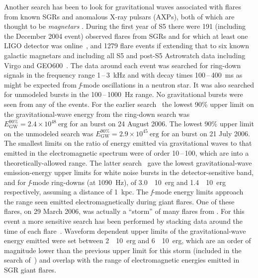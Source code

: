 Another search has been to look for gravitational waves associated with flares from known SGRs and anomalous 
X-ray pulsars (AXPs), both of which are thought to be \textit{magnetars} \cite{Mereghetti2008}. During the 
first year of S5 there were 191 (including the December 2004  event) observed 
flares from SGRs  and
 for which at least one LIGO detector was online~\cite{Abbott:2008h}, and
1279 flare events if extending that to six known galactic magnetars and including all S5 and post-S5 
Astrowatch data including Virgo and GEO600~\cite{Abadie:2010c}. The data around each event was searched
for ring-down signals in the frequency range 1\,--\,3~kHz and with decay times 100\,--\,400~ms as might be 
expected from \textit{f}-mode oscillations in a neutron star. It was also searched for unmodeled
bursts in the 100\,--\,1000~Hz range. No gravitational bursts were seen from any of the events. For the 
earlier search~\cite{Abbott:2008h} the lowest 90\% upper limit on the gravitational-wave energy from the 
ring-down search was $E_{\mathrm{GW}}^{90\%} = 2.4\times10^{48}\mathrm{\ erg}$ for an 
 burst on 24 August 2006. The lowest 90\% upper limit on the unmodeled search was
$E_{\mathrm{GW}}^{90\%} = 2.9\times10^{45}\mathrm{\ erg}$ for an  burst on 21 July 
2006. The smallest limits on the ratio of energy emitted via gravitational waves to that emitted in the 
electromagnetic spectrum were of order 10\,--\,100, which are into a theoretically-allowed range. The latter 
search~\cite{Abadie:2010c} gave the lowest gravitational-wave emission-energy upper limits for white noise 
bursts in the detector-sensitive band, and for \textit{f}-mode ring-downs (at 1090~Hz), of 
3.0~\texttimes~10~erg and 1.4~\texttimes~10~erg respectively, assuming a distance of
1~kpc. The \textit{f}-mode energy limits approach the range seen emitted electromagnetically during giant 
flares. One of these flares, on 29 March 2006, was actually a ``storm'' of many flares from
. For this event a more sensitive search has been performed by stacking data around 
the time of each flare~\cite{Abbott:2009c}. Waveform dependent upper limits of the gravitational-wave energy 
emitted were set between 2~\texttimes~10~erg and 6~\texttimes~10~erg, which are an order 
of magnitude lower than the previous upper limit for this storm (included in the search 
of~\cite{Abbott:2008h}) and overlap with the range of electromagnetic energies emitted in SGR giant flares.

